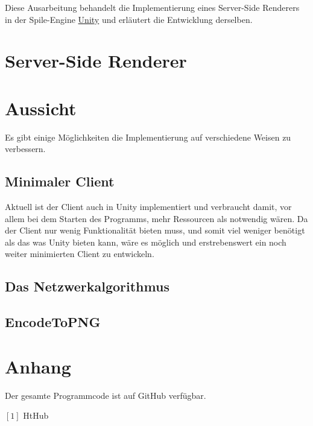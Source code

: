 \documentclass[11pt,parskip=full]{scrartcl}
\begin{document}
Diese Ausarbeitung behandelt die Implementierung eines Server-Side Renderers in der Spile-Engine \href{https://unity.com/}{Unity} und erläutert die Entwicklung derselben.

\section{Server-Side Renderer}

\section{Aussicht}
Es gibt einige Möglichkeiten die Implementierung auf verschiedene Weisen zu verbessern.

\subsection{Minimaler Client}
Aktuell ist der Client auch in Unity implementiert und verbraucht damit, vor allem bei dem Starten des Programms, mehr Ressourcen als notwendig wären. Da der Client nur wenig Funktionalität bieten muss, und somit viel weniger benötigt als das was Unity bieten kann, wäre es möglich und erstrebenswert ein noch weiter minimierten Client zu entwickeln.

\subsection{Das Netzwerkalgorithmus}

\subsection{EncodeToPNG}


\section{Anhang}

Der gesamte Programmcode ist auf GitHub verfügbar.

$[1]$ HtHub
\end{document}

